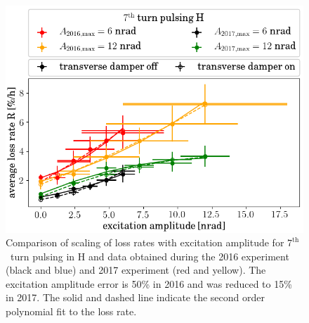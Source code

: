 \documentclass[%
 reprint,
 amsmath,amssymb,
 aps,
prstab,
longbibliography
]{revtex4-1}
\begin{document}
\begin{figure}
	\centering
	\includegraphics[width=1.0\linewidth]{2016+2017_scale_amp_7h_lblshort.png}
	\caption{\label{fig:7thexploss} Comparison of scaling of loss rates with excitation amplitude for $7^{\mathrm{th}}$~turn pulsing in H and data obtained during the 2016 experiment (black and blue) and 2017 experiment (red and yellow). The excitation amplitude error is 50\% in 2016 and was reduced to 15\% in 2017. The solid and dashed line indicate the second order polynomial fit to the loss rate.}
\end{figure}
\end{document}
